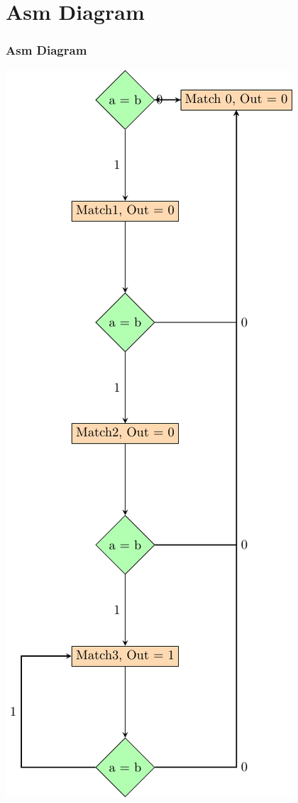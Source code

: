 \documentclass{beamer}
\begin{document}
\section{Asm Diagram}
\begin{frame}
\frametitle{Asm Diagram}
\includegraphics[height=0.8\textheight] {../diagrams/Asm-diagram.pdf}
\end{frame}
\end{document}
